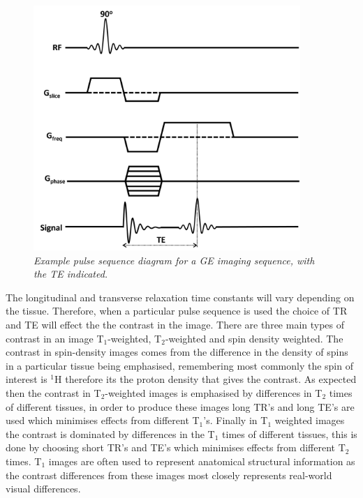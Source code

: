 \begin{figure}
    \centering
    \includegraphics[width=0.9\textwidth]{Figures/Theory/GRE_sequence.png}
    \caption{\textit{Example pulse sequence diagram for a \ac{GE} imaging sequence, with the \ac{TE} indicated.}}
    \label{fig:theory:GRE}
\end{figure}

The longitudinal and transverse relaxation time constants will vary depending on the tissue. Therefore, when a particular pulse sequence is used the choice of \ac{TR} and \ac{TE} will effect the the contrast in the image. There are three main types of contrast in an image T$_1$-weighted, T$_2$-weighted and spin density weighted. The contrast in spin-density images comes from the difference in the density of spins in a particular tissue being emphasised, remembering most commonly the spin of interest is $^1$H therefore its the proton density that gives the contrast. As expected then the contrast in T$_2$-weighted images is emphasised by differences in T$_2$ times of different tissues, in order to produce these images long \ac{TR}'s and long \ac{TE}'s are used which minimises effects from different T$_1$'s. Finally in T$_1$ weighted images the contrast is dominated by differences in the T$_1$ times of different tissues, this is done by choosing short \ac{TR}'s and \ac{TE}'s which minimises effects from different T$_2$ times. T$_1$ images are often used to represent anatomical structural information as the contrast differences from these images most closely represents real-world visual differences. 

